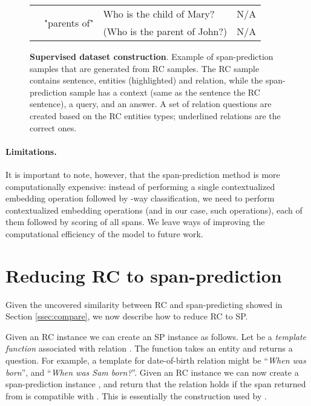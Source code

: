 \documentclass[11pt]{article}
\begin{document}
\begin{figure*}[t!]
\begin{tabular}{llll}
                                         & \multirow{2}{*}{"parents of"}                                           & Who is the child of Mary?                                                      & N/A             \\ \cline{4-4} 
                                         &                                                                         & (Who is the parent of John?)                                                   & N/A             \\ \hline
\end{tabular}
\caption{\textbf{Supervised dataset construction}. Example of span-prediction samples that are generated from RC samples. The RC sample contains sentence, entities (highlighted) and relation, while the span-prediction sample has a context (same as the sentence the RC sentence), a query, and an answer. A set of relation questions are created based on the RC entities types; underlined relations are the correct ones.}
\label{fig:mrcqa-example}
\end{figure*}

\paragraph{Limitations.} It is important to note, however, that the span-prediction method is more computationally expensive: instead of performing a single contextualized embedding operation followed by -way classification, we need to perform  contextualized embedding operations (and in our case,  such operations), each of them followed by scoring of all spans. We leave ways of improving the computational efficiency of the model to future work.








\section{Reducing RC to span-prediction} \label{sec:method}
Given the uncovered similarity between RC and span-predicting showed in Section \ref{ssec:compare}, we now describe how to reduce RC to SP.

Given an RC instance  we can create an SP instance  as follows. Let  be a \emph{template function} associated with relation . The function takes an entity  and returns a question. For example, a template for date-of-birth relation might be ``\textit{When was \underline{\hspace{1em}} born}'', and ``\textit{When was Sam born?}''. Given an RC instance  we can now create a span-prediction instance , and return that the relation  holds if the span returned from  is compatible with . This is essentially the construction used by \citep{Levy2017}. 
\end{document}
